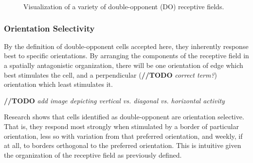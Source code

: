 \documentclass[journal,onecolumn]{IEEEtran}
\begin{document}
\begin{figure}[H]
    \caption{Visualization of a variety of double-opponent (DO) receptive fields.}
    \label{fig:rf-do}
\end{figure}


\subsubsection*{Orientation Selectivity}

By the definition of double-opponent cells accepted here, they inherently response best to specific orientations. By arranging the components of the receptive field in a spatially antagonistic organization, there will be one orientation of edge which best stimulates the cell, and a perpendicular (\textbf{//TODO} \textit{correct term?}) orientation which least stimulates it.

\textbf{//TODO} \textit{add image depicting vertical vs. diagonal vs. horizontal activity}

Research shows that cells identified as double-opponent are orientation selective. That is, they respond most strongly when stimulated by a border of particular orientation, less so with variation from that preferred orientation, and weekly, if at all, to borders orthogonal to the preferred orientation. This is intuitive given the organization of the receptive field as previously defined.
\end{document}
